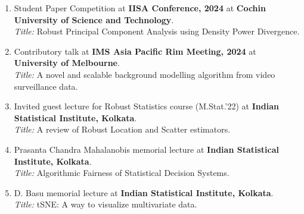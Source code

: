 \documentclass[10pt]{developercv} %
\begin{document}
\begin{enumerate}
    \item Student Paper Competition at \textbf{IISA Conference, 2024} at \textbf{Cochin University of Science and Technology}. \\
    \emph{Title:} Robust Principal Component Analysis using Density Power Divergence.
    \item Contributory talk at \textbf{IMS Asia Pacific Rim Meeting, 2024} at \textbf{University of Melbourne}. \\
    \emph{Title:} A novel and scalable background modelling algorithm from video surveillance data.
    \item Invited guest lecture for Robust Statistics course (M.Stat.'22) at \textbf{Indian Statistical Institute, Kolkata}.\\
    \emph{Title:} A review of Robust Location and Scatter estimators.
    \item Prasanta Chandra Mahalanobis memorial lecture at \textbf{Indian Statistical Institute, Kolkata}.\\
    \emph{Title:} Algorithmic Fairness of Statistical Decision Systems.
    \item D. Basu memorial lecture at \textbf{Indian Statistical Institute, Kolkata}.\\
    \emph{Title:} tSNE: A way to visualize multivariate data.
\end{enumerate}
\end{document}
